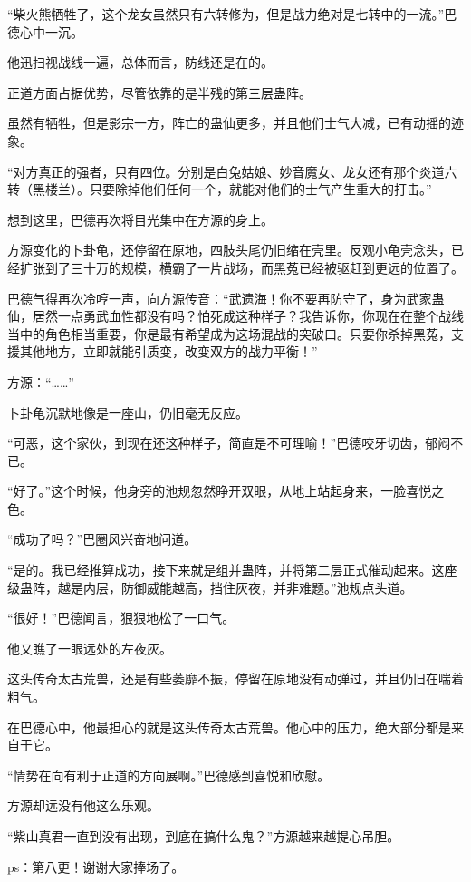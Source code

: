 \begin{this_body}
“柴火熊牺牲了，这个龙女虽然只有六转修为，但是战力绝对是七转中的一流。”巴德心中一沉。

他迅扫视战线一遍，总体而言，防线还是在的。

正道方面占据优势，尽管依靠的是半残的第三层蛊阵。

虽然有牺牲，但是影宗一方，阵亡的蛊仙更多，并且他们士气大减，已有动摇的迹象。

“对方真正的强者，只有四位。分别是白兔姑娘、妙音魔女、龙女还有那个炎道六转（黑楼兰）。只要除掉他们任何一个，就能对他们的士气产生重大的打击。”

想到这里，巴德再次将目光集中在方源的身上。

方源变化的卜卦龟，还停留在原地，四肢头尾仍旧缩在壳里。反观小龟壳念头，已经扩张到了三十万的规模，横霸了一片战场，而黑菟已经被驱赶到更远的位置了。

巴德气得再次冷哼一声，向方源传音：“武遗海！你不要再防守了，身为武家蛊仙，居然一点勇武血性都没有吗？怕死成这种样子？我告诉你，你现在在整个战线当中的角色相当重要，你是最有希望成为这场混战的突破口。只要你杀掉黑菟，支援其他地方，立即就能引质变，改变双方的战力平衡！”

方源：“……”

卜卦龟沉默地像是一座山，仍旧毫无反应。

“可恶，这个家伙，到现在还这种样子，简直是不可理喻！”巴德咬牙切齿，郁闷不已。

“好了。”这个时候，他身旁的池规忽然睁开双眼，从地上站起身来，一脸喜悦之色。

“成功了吗？”巴圈风兴奋地问道。

“是的。我已经推算成功，接下来就是组并蛊阵，并将第二层正式催动起来。这座级蛊阵，越是内层，防御威能越高，挡住灰夜，并非难题。”池规点头道。

“很好！”巴德闻言，狠狠地松了一口气。

他又瞧了一眼远处的左夜灰。

这头传奇太古荒兽，还是有些萎靡不振，停留在原地没有动弹过，并且仍旧在喘着粗气。

在巴德心中，他最担心的就是这头传奇太古荒兽。他心中的压力，绝大部分都是来自于它。

“情势在向有利于正道的方向展啊。”巴德感到喜悦和欣慰。

方源却远没有他这么乐观。

“紫山真君一直到没有出现，到底在搞什么鬼？”方源越来越提心吊胆。

ps：第八更！谢谢大家捧场了。

\end{this_body}

